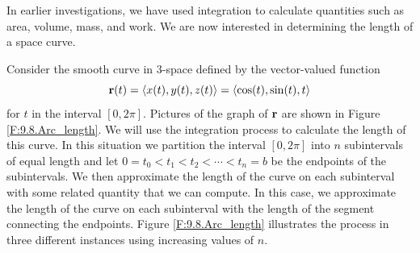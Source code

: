 \begin{pa} \label{PA:9.8} In earlier investigations, we have used
  integration to calculate quantities such as area, volume, mass, and
  work.  We are now interested in determining the 
  length of a space curve.

  Consider the smooth curve in 3-space defined by the vector-valued
  function
    \[\mathbf{r}(t) = \langle x(t), y(t), z(t) \rangle = \langle \cos(t), \sin(t), t \rangle\]
    for $t$ in the interval $[0,2\pi]$. Pictures of the graph of $\mathbf{r}$ are shown in Figure \ref{F:9.8.Arc_length}.
  We will use the integration process to calculate the length of this curve. In this situation we partition the interval $[0,2\pi]$ into $n$ subintervals of equal length and let $0 = t_0 < t_1 < t_2 < \cdots < t_n = b$ be the endpoints of the subintervals. We then approximate the length of the curve on each subinterval with some related quantity that we can compute. In this case, we approximate the length of the curve on each subinterval with the length of the segment connecting the endpoints. Figure \ref{F:9.8.Arc_length} illustrates the process in three different instances using increasing values of $n$. 
\begin{figure}[ht]
\begin{center}

\end{center}
\end{figure}
\end{pa}
